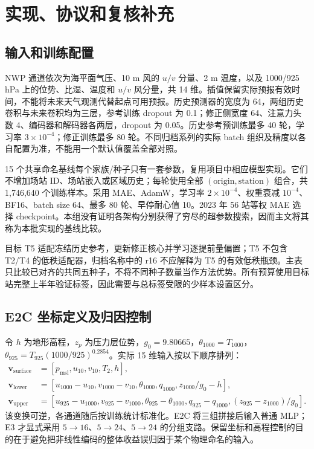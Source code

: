 \section{实现、协议和复核补充}
\subsection{输入和训练配置}
NWP 通道依次为海平面气压、10 m 风的 $u/v$ 分量、2 m 温度，以及 1000/925 hPa 上的位势、比湿、温度和 $u/v$ 风分量，共 14 维。插值保留实际预报有效时间，不能将未来天气观测代替起点可用预报。历史预测器的宽度为 64，两组历史卷积与未来卷积均为三层，参考训练 dropout 为 0.1；修正侧宽度 64、注意力头数 4、编码器和解码器各两层，dropout 为 0.05。历史参考预训练最多 40 轮，学习率 $3\times10^{-4}$；修正训练最多 80 轮。不同归档系列的实际 batch 组织及精度以各自配置为准，不能用一个默认值覆盖全部对照。

15 个共享命名基线每个家族/种子只有一套参数，复用项目中相应模型实现。它们不增加场站 ID、场站嵌入或区域历史；每轮使用全部 $(\mathrm{origin},\mathrm{station})$ 组合，共 1,746,640 个训练样本。采用 MAE、AdamW，学习率 $2\times10^{-4}$、权重衰减 $10^{-4}$、BF16、batch size 64、最多 80 轮、早停耐心值 10。2023 年 56 站等权 MAE 选择 checkpoint。本组没有证明各架构分别获得了穷尽的超参数搜索，因而主文将其称为本批实现的基线比较。

目标 T5 适配冻结历史参考，更新修正核心并学习逐提前量偏置；T5 不包含 T2/T4 的低秩适配器，归档名称中的 r16 不应解释为 T5 的有效低秩瓶颈。主表只比较已对齐的共同五种子，不将不同种子数量当作方法优势。所有预算使用目标站完整上半年验证标签，因此需要与总标签受限的少样本设置区分。

\subsection{E2C 坐标定义及归因控制}
令 $h$ 为地形高程，$z_p$ 为压力层位势，$g_0=9.80665$，$\theta_{1000}=T_{1000}$，$\theta_{925}=T_{925}(1000/925)^{0.2854}$。实际 15 维输入按以下顺序排列：
\begin{align}
 \mathbf v_{\mathrm{surface}}&=[p_{\mathrm{msl}},u_{10},v_{10},T_2,h],\\
 \mathbf v_{\mathrm{lower}}&=[u_{1000}-u_{10},v_{1000}-v_{10},\theta_{1000},q_{1000},z_{1000}/g_0-h],\\
 \mathbf v_{\mathrm{upper}}&=[u_{925}-u_{1000},v_{925}-v_{1000},\theta_{925}-\theta_{1000},
 q_{925}-q_{1000},(z_{925}-z_{1000})/g_0].
\end{align}
该变换可逆，各通道随后按训练统计标准化。E2C 将三组拼接后输入普通 MLP；E3 才显式采用 $5\rightarrow16$、$5\rightarrow24$、$5\rightarrow24$ 的分组支路。保留坐标和高程控制的目的在于避免把非线性编码的整体收益误归因于某个物理命名的输入。

